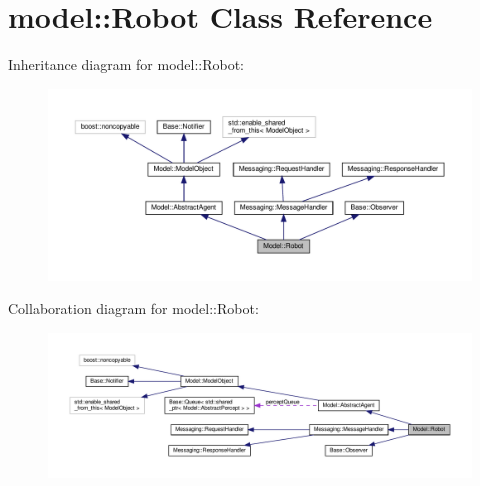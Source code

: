 \hypertarget{class_model_1_1_robot}{}\section{model\+:\+:Robot Class Reference}
\label{class_model_1_1_robot}


Inheritance diagram for model\+:\+:Robot\+:
\nopagebreak
\begin{figure}[H]
\begin{center}
\leavevmode
\includegraphics[width=350pt]{class_model_1_1_robot__inherit__graph}
\end{center}
\end{figure}


Collaboration diagram for model\+:\+:Robot\+:
\nopagebreak
\begin{figure}[H]
\begin{center}
\leavevmode
\includegraphics[width=350pt]{class_model_1_1_robot__coll__graph}
\end{center}
\end{figure}
